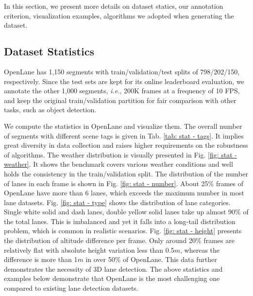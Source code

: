 \documentclass[runningheads]{llncs}
\begin{document}
In this section, we present more details on dataset statics, our annotation criterion, visualization examples, algorithms we adopted when generating the dataset.

\subsection{Dataset Statistics}

OpenLane has 1,150 segments with train/validation/test splits of 798/202/150, respectively. Since the test sets are kept for its online leaderboard evaluation, we annotate the other 1,000 segments, \textit{i.e.}, 200K frames at a frequency of 10 FPS, and keep the original train/validation partition for fair comparison with other tasks, such as object detection.

We compute the statistics in OpenLane and visualize them.
The overall number of segments with different scene tags is given in Tab. \ref{tab: stat - tags}. It implies great diversity in data collection and raises higher requirements on the robustness of algorithms.
The weather distribution is visually presented 
in Fig. \ref{fig: stat - weather}. It shows the benchmark covers various weather conditions and well holds the consistency in the train/validation split.
The distribution of the number of lanes in each frame is shown in Fig. \ref{fig: stat - number}. About 25\% frames of OpenLane have more than 6 lanes, which exceeds the maximum number in most lane datasets. 
Fig. \ref{fig: stat - type} shows the distribution of lane categories. 
Single white solid and dash lanes, double yellow solid lanes take up almost 90\% of the total lanes. This is imbalanced and yet it falls into a long-tail distribution problem, which is common in realistic scenarios. 
Fig. \ref{fig: stat - height} presents the distribution of altitude difference per frame. Only around 20\% frames are relatively flat with absolute height variation less than 0.5$m$, whereas the difference is more than 1$m$ in over 50\% of OpenLane. This data further demonstrates the necessity of 3D lane detection.
The above statistics and examples below demonstrate that OpenLane is the most challenging one compared to existing lane detection datasets.
\end{document}
